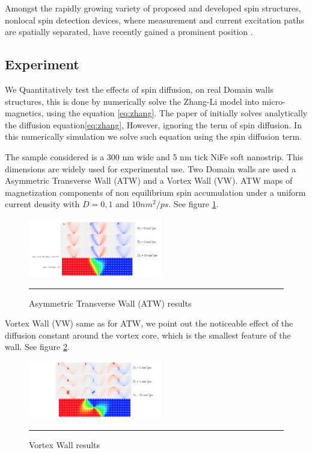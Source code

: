 Amongst the rapidly growing variety of proposed and developed spin structures, nonlocal spin detection devices, where measurement and current excitation paths are spatially separated, have recently gained a prominent position \cite{spinz}.

\subsection{Experiment}

We Quantitatively test the effects of spin diffusion, on real Domain walls structures, this is done by numerically solve the Zhang-Li model into micro-magnetics, using the equation \ref{eq:zhang}. The paper of \cite{zhang} initially solves analytically the diffusion equation\ref{eq:zhang}, However, ignoring the term of spin diffusion. In this numerically simulation we solve such equation using the spin diffusion term.

The sample considered is a 300 nm wide and 5 nm tick NiFe soft nanostrip. This dimensions are widely used for experimental use. Two Domain walls are used a Asymmetric Transverse Wall (ATW) and a Vortex Wall (VW). ATW maps of magnetization components of non equilibrium spin accumulation under a uniform current density with $D = 0, 1$ and $10 nm^2 / ps$. See figure \ref{fig:atw}.

\begin{figure}[htbp]
	\centering
		\includegraphics[width=0.52\textwidth]{Figures/ATW.png}
		\rule{35em}{0.5pt}
	\caption[Asymmetric Transverse Wall results]{Asymmetric Transverse Wall (ATW) results}
	\label{fig:atw}
\end{figure}

Vortex Wall (VW) same as for ATW, we point out the noticeable effect of the diffusion constant around the vortex core, which is the smallest feature of the wall. See figure \ref{fig:vw}.

\begin{figure}[htbp]
	\centering
		\includegraphics[width=0.52\textwidth]{Figures/VW.png}
		\rule{35em}{0.5pt}
	\caption[Vortex Wall results]{Vortex Wall results}
	\label{fig:vw}
\end{figure}

